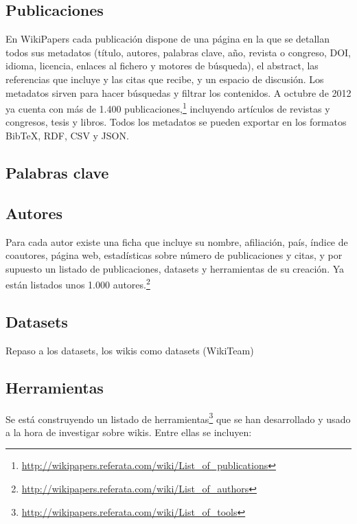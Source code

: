 \documentclass[11pt,twocolumn]{article}
\begin{document}
\subsection{Publicaciones}
En WikiPapers cada publicación dispone de una página en la que se detallan todos sus metadatos (título, autores, palabras clave, año, revista o congreso, DOI, idioma, licencia, enlaces al fichero y motores de búsqueda), el abstract, las referencias que incluye y las citas que recibe, y un espacio de discusión. Los metadatos sirven para hacer búsquedas y filtrar los contenidos. A octubre de 2012 ya cuenta con más de 1.400 publicaciones,\footnote{\href{http://wikipapers.referata.com/wiki/List_of_publications}{http://wikipapers.referata.com/wiki/List\_of\_publications}} incluyendo artículos de revistas y congresos, tesis y libros. Todos los metadatos se pueden exportar en los formatos BibTeX, RDF, CSV y JSON.

\subsection{Palabras clave}

\subsection{Autores}
Para cada autor existe una ficha que incluye su nombre, afiliación, país, índice de coautores, página web, estadísticas sobre número de publicaciones y citas, y por supuesto un listado de publicaciones, datasets y herramientas de su creación. Ya están listados unos 1.000 autores.\footnote{\href{http://wikipapers.referata.com/wiki/List_of_authors}{http://wikipapers.referata.com/wiki/List\_of\_authors}}

\subsection{Datasets}
Repaso a los datasets, los wikis como datasets (WikiTeam)

\subsection{Herramientas}
Se está construyendo un listado de herramientas\footnote{\href{http://wikipapers.referata.com/wiki/List_of_tools}{http://wikipapers.referata.com/wiki/List\_of\_tools}} que se han desarrollado y usado a la hora de investigar sobre wikis. Entre ellas se incluyen:
\end{document}
